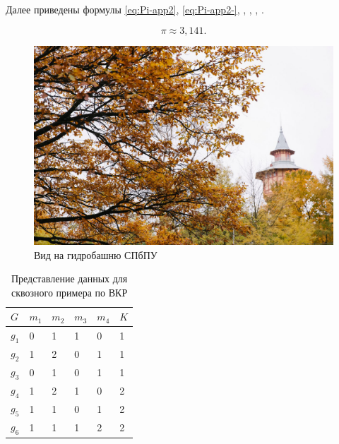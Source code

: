 

Далее приведены формулы \eqref{eq:Pi-app2}, \eqref{eq:Pi-app2-},  , , , .


\begin{equation}%
\label{eq:Pi-app2-} %
\pi \approx 3,141.
\end{equation}

%
\begin{figure}[ht!] 
	\center
	\includegraphics [scale=0.27] {my_folder/images//spbpu_hydrotower}
	\caption{Вид на гидробашню СПбПУ \cite{spbpu-gallery}} 
	\label{fig:spbpu_hydrotower-app2-}  
\end{figure}

\begin{table} [htbp]%
	\centering\small
	\caption{Представление данных для сквозного примера по ВКР \cite{Peskov2004}}%
	\label{tab:ToyCompare-app2-}		
	\begin{tabular}{|l|l|l|l|l|l|}
		\hline
		$G$&$m_1$&$m_2$&$m_3$&$m_4$&$K$\\
		\hline
		$g_1$&0&1&1&0&1\\ \hline
		$g_2$&1&2&0&1&1\\ \hline
		$g_3$&0&1&0&1&1\\ \hline
		$g_4$&1&2&1&0&2\\ \hline
		$g_5$&1&1&0&1&2\\ \hline
		$g_6$&1&1&1&2&2\\ \hline		
	\end{tabular}	
	\normalsize%
\end{table}




